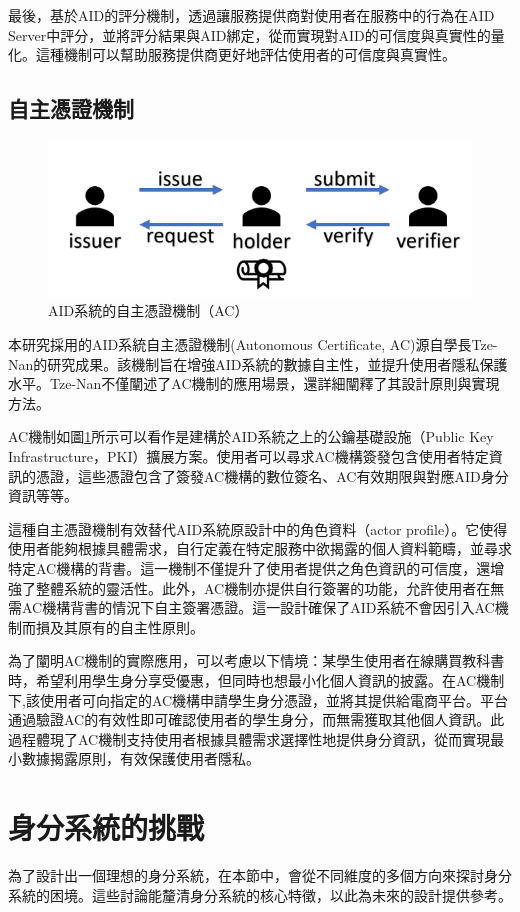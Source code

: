最後，基於AID的評分機制，透過讓服務提供商對使用者在服務中的行為在AID Server中評分，並將評分結果與AID綁定，從而實現對AID的可信度與真實性的量化。這種機制可以幫助服務提供商更好地評估使用者的可信度與真實性。
\subsection{自主憑證機制}
\begin{figure}
  \centering
  \includegraphics[width=\linewidth,keepaspectratio]{figures/old-AC.png}
  \caption{AID系統的自主憑證機制（AC）}
  \label{fig:old-ac}
\end{figure}
本研究採用的AID系統自主憑證機制(Autonomous Certificate, AC)源自學長Tze-Nan\cite{NTU202102846}的研究成果。該機制旨在增強AID系統的數據自主性，並提升使用者隱私保護水平。Tze-Nan不僅闡述了AC機制的應用場景，還詳細闡釋了其設計原則與實現方法。

AC機制如圖\ref{fig:old-ac}所示可以看作是建構於AID系統之上的公鑰基礎設施（Public Key Infrastructure，PKI）擴展方案。使用者可以尋求AC機構簽發包含使用者特定資訊的憑證，這些憑證包含了簽發AC機構的數位簽名、AC有效期限與對應AID身分資訊等等。

這種自主憑證機制有效替代AID系統原設計中的角色資料（actor profile）。它使得使用者能夠根據具體需求，自行定義在特定服務中欲揭露的個人資料範疇，並尋求特定AC機構的背書。這一機制不僅提升了使用者提供之角色資訊的可信度，還增強了整體系統的靈活性。此外，AC機制亦提供自行簽署的功能，允許使用者在無需AC機構背書的情況下自主簽署憑證。這一設計確保了AID系統不會因引入AC機制而損及其原有的自主性原則。

為了闡明AC機制的實際應用，可以考慮以下情境：某學生使用者在線購買教科書時，希望利用學生身分享受優惠，但同時也想最小化個人資訊的披露。在AC機制下,該使用者可向指定的AC機構申請學生身分憑證，並將其提供給電商平台。平台通過驗證AC的有效性即可確認使用者的學生身分，而無需獲取其他個人資訊。此過程體現了AC機制支持使用者根據具體需求選擇性地提供身分資訊，從而實現最小數據揭露原則，有效保護使用者隱私。
\section{身分系統的挑戰}
為了設計出一個理想的身分系統，在本節中，會從不同維度的多個方向來探討身分系統的困境。這些討論能釐清身分系統的核心特徵，以此為未來的設計提供參考。
